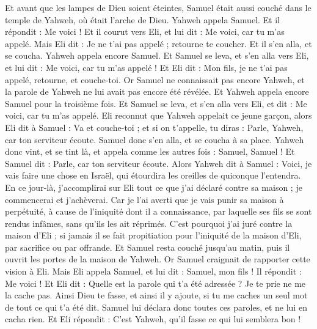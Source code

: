 \begin{multicols}{2}
Et avant que les lampes de Dieu soient éteintes, Samuel était aussi couché dans le temple de Yahweh, où était l'arche de Dieu.
Yahweh appela Samuel. Et il répondit : Me voici !
Et il courut vers Eli, et lui dit : Me voici, car tu m'as appelé. Mais Eli dit : Je ne t'ai pas appelé ; retourne te coucher. Et il s'en alla, et se coucha.
Yahweh appela encore Samuel. Et Samuel se leva, et s'en alla vers Eli, et lui dit : Me voici, car tu m'as appelé ! Et Eli dit : Mon fils, je ne t'ai pas appelé, retourne, et couche-toi.
Or Samuel ne connaissait pas encore Yahweh, et la parole de Yahweh ne lui avait pas encore été révélée.
Et Yahweh appela encore Samuel pour la troisième fois. Et Samuel se leva, et s'en alla vers Eli, et dit : Me voici, car tu m'as appelé. Eli reconnut que Yahweh appelait ce jeune garçon,
alors Eli dit à Samuel : Va et couche-toi ; et si on t'appelle, tu diras : Parle, Yahweh, car ton serviteur écoute. Samuel donc s'en alla, et se coucha à sa place.
Yahweh donc vint, et se tint là, et appela comme les autres fois : Samuel, Samuel ! Et Samuel dit : Parle, car ton serviteur écoute.
Alors Yahweh dit à Samuel : Voici, je vais faire une chose en Israël, qui étourdira les oreilles de quiconque l'entendra.
En ce jour-là, j'accomplirai sur Eli tout ce que j'ai déclaré contre sa maison ; je commencerai et j'achèverai.
Car je l'ai averti que je vais punir sa maison à perpétuité, à cause de l'iniquité dont il a connaissance, par laquelle ses fils se sont rendus infâmes, sans qu'ils les ait réprimés.
C'est pourquoi j'ai juré contre la maison d'Eli ; si jamais il se fait propitiation pour l'iniquité de la maison d'Eli, par sacrifice ou par offrande.
Et Samuel resta couché jusqu'au matin, puis il ouvrit les portes de la maison de Yahweh. Or Samuel craignait de rapporter cette vision à Eli.
Mais Eli appela Samuel, et lui dit : Samuel, mon fils ! Il répondit : Me voici !
Et Eli dit : Quelle est la parole qui t'a été adressée ? Je te prie ne me la cache pas. Ainsi Dieu te fasse, et ainsi il y ajoute, si tu me caches un seul mot de tout ce qui t'a été dit.
Samuel lui déclara donc toutes ces paroles, et ne lui en cacha rien. Et Eli répondit : C'est Yahweh, qu'il fasse ce qui lui semblera bon !

\end{multicols}
